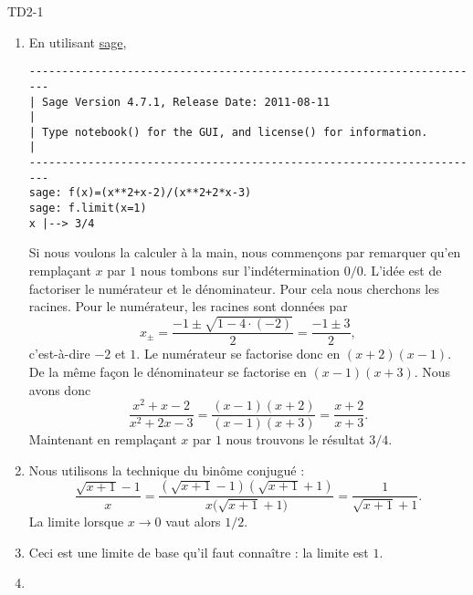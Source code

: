 
\begin{corrige}{TD2-1}

	\begin{enumerate}
		\item
            En utilisant \href{http://www.sagemath.org}{sage},
            \begin{verbatim}
----------------------------------------------------------------------
| Sage Version 4.7.1, Release Date: 2011-08-11                       |
| Type notebook() for the GUI, and license() for information.        |
----------------------------------------------------------------------
sage: f(x)=(x**2+x-2)/(x**2+2*x-3)
sage: f.limit(x=1)
x |--> 3/4
            \end{verbatim}
            Si nous voulons la calculer à la main, nous commençons par remarquer qu'en remplaçant \( x\) par \( 1\) nous tombons sur l'indétermination \( 0/0\). L'idée est de factoriser le numérateur et le dénominateur. Pour cela nous cherchons les racines. Pour le numérateur, les racines sont données par
            \begin{equation}
                x_{\pm}=\frac{ -1\pm\sqrt{1-4\cdot(-2)} }{ 2 }=\frac{ -1\pm3 }{2},
            \end{equation}
            c'est-à-dire \( -2\) et \( 1\). Le numérateur se factorise donc en \( (x+2)(x-1)\). De la même façon le dénominateur se factorise en \( (x-1)(x+3)\). Nous avons donc
            \begin{equation}
                \frac{ x^2+x-2 }{ x^2+2x-3 }=\frac{ (x-1)(x+2) }{ (x-1)(x+3) }=\frac{ x+2 }{ x+3 }.
            \end{equation}
            Maintenant en remplaçant \( x\) par \( 1\) nous trouvons le résultat \( 3/4\).
		\item
            Nous utilisons la technique du binôme conjugué :
            \begin{equation}
                \frac{ \sqrt{x+1}-1 }{ x }=\frac{ \left( \sqrt{x+1}-1 \right)\left( \sqrt{x+1}+1 \right) }{ x\big( \sqrt{x+1}+1 \big) }=\frac{ 1 }{ \sqrt{x+1}+1 }.
            \end{equation}
            La limite lorsque \( x\to 0\) vaut alors \( 1/2\).
		\item
			Ceci est une limite de base qu'il faut connaître : la limite est $1$.
		\item

\end{enumerate}
\end{corrige}
